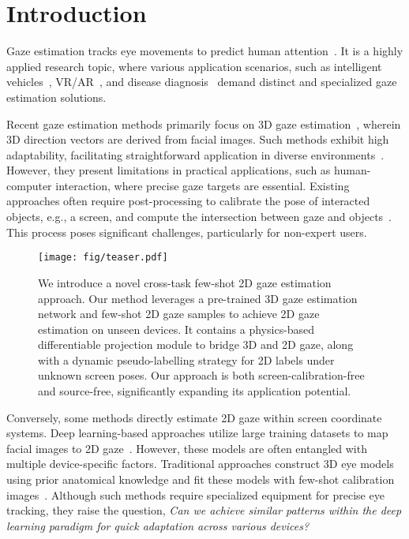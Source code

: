 \section{Introduction}
\label{sec:intro}

Gaze estimation tracks eye movements to predict human attention~\cite{Cheng_2024_pami}. It is a highly applied research topic, where various application scenarios, such as intelligent vehicles~\cite{cheng2024ivgaze, s19245540}, VR/AR~\cite{Palazzi_2019_tpami, patney2016towards, mania2021gaze}, and disease diagnosis~\cite{Wang2022app,bhattacharya2022gazeradar} demand distinct and specialized gaze estimation solutions.

Recent gaze estimation methods primarily focus on 3D gaze estimation~\cite{Zhang_2015_CVPR,cheng2022icpr}, wherein 3D direction vectors are derived from facial images.
Such methods exhibit high adaptability, facilitating straightforward application in diverse environments~\cite{Zhang_2018_CHI}. 
However, they present limitations in practical applications, such as human-computer interaction, where precise gaze targets are essential. Existing approaches often require post-processing to calibrate the pose of interacted objects, e.g., a screen, and compute the intersection between gaze and objects~\cite{Zhang_2019_CHI}. This process poses significant challenges, particularly for non-expert users.

\begin{figure}[t]
	\begin{center}
		\texttt{[image: fig/teaser.pdf]}	
	\end{center}
        \vspace{-4mm}
	\caption{We introduce a novel cross-task few-shot 2D gaze estimation approach. Our method leverages a pre-trained 3D gaze estimation network and few-shot 2D gaze samples to achieve 2D gaze estimation on unseen devices. It contains a physics-based differentiable projection module to bridge 3D and 2D gaze, along with a dynamic pseudo-labelling strategy for 2D labels under unknown screen poses. Our approach is both screen-calibration-free and source-free, significantly expanding its application potential.\vspace{-7mm}}
	\label{fig:teaser}
\end{figure}

Conversely, some methods directly estimate 2D gaze within screen coordinate systems. Deep learning-based approaches utilize large training datasets to map facial images to 2D gaze~\cite{Krafka_2016_CVPR,Bao_2020_ICPR}.
However, these models are often entangled with multiple device-specific factors.
Traditional approaches construct 3D eye models using prior anatomical knowledge and fit these models with few-shot calibration images~\cite{hansen2009eye}. Although such methods require specialized equipment for precise eye tracking, they raise the question, \textit{Can we achieve similar patterns within the deep learning paradigm for quick adaptation across various devices? }



